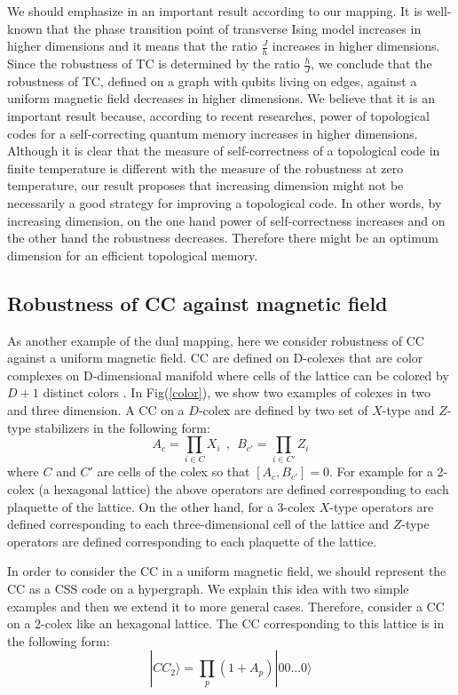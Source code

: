 \documentclass[preprintnumbers, showpacs, floatfix,twocolumn,
preprintnumbers, superscriptaddress]{revtex4}
\def\ra{\rangle}
\begin{document}
We should emphasize in an important result according to our
mapping. It is well-known that the phase transition point of
transverse Ising model increases in higher dimensions and it means
that the ratio $\frac{J}{h}$ increases in higher dimensions. Since
the robustness of TC is determined by the ratio $\frac{h}{J}$, we
conclude that the robustness of TC, defined on a graph with qubits living on edges, against a uniform magnetic
field decreases in higher dimensions. We believe that it is an
important result because, according to recent researches, power of
topological codes for a self-correcting quantum memory increases
in higher dimensions. Although it is clear that the measure of
self-correctness of a topological code in finite temperature is
different with the measure of the robustness at zero temperature,
our result proposes that increasing dimension might not be
necessarily a good strategy for improving a topological code. In
other words, by increasing dimension, on the one hand power of
self-correctness increases and on the other hand the robustness
decreases. Therefore there might be an optimum dimension for an
efficient topological memory.

\subsection{Robustness of CC against magnetic field}
As another example of the dual mapping, here we consider robustness of CC against a uniform magnetic field. CC are defined on D-colexes that are color complexes on D-dimensional manifold where cells of the lattice can be colored by $D+1$ distinct colors \cite{delgad}. In Fig(\ref{color}), we show two examples of colexes in two and three dimension. A CC on a $D$-colex are defined by two set of $X$-type and $Z$-type stabilizers in the following form:
\begin{equation}
A_c =\prod_{i\in C}X_i ~~,~~B_{c'} =\prod_{i\in C'} Z_i
\end{equation}
where $C$ and $C'$ are cells of the colex so that $[A_c
,B_{c'}]=0$. For example for a 2-colex (a hexagonal lattice) the
above operators are defined corresponding to each plaquette of the
lattice. On the other hand, for a 3-colex $X$-type operators are
defined corresponding to each three-dimensional cell of the
lattice and $Z$-type operators are defined corresponding to each
plaquette of the lattice.

In order to consider the CC in a uniform magnetic field, we should represent the CC as a CSS code on a hypergraph. We explain this idea with two simple examples and then we extend it to more general cases. Therefore, consider a CC on a 2-colex like an hexagonal lattice. The CC corresponding to this lattice is in the following form:
\begin{equation}
|CC_2 \ra =\prod_{p}(1+A_p)|00...0\ra
\end{equation}
\end{document}
